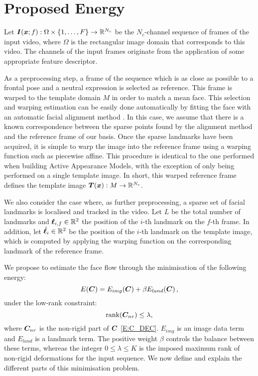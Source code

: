 \section{Proposed Energy}
Let $\boldsymbol{I}(\boldsymbol{x};f):\Omega\times \{1,\ldots,F\} \rightarrow \mathbb{R}^{N_c}$ be the
$N_c$-channel sequence of frames of the input video, where $\Omega$ is the
rectangular image domain that corresponds to this video. The channels of the
input frames originate from the application of some appropriate feature descriptor.

As a preprocessing step, a frame of the sequence which is as close as possible to
a frontal pose and a neutral expression is selected as reference. This frame is
warped to the template domain $M$ in order to match a mean face. This selection
and warping estimation can be easily done automatically by fitting the face
with an automatic facial alignment method \cite{kazemi2014one,matthews2004active}. In this 
case, we assume that there is a known correspondence between the sparse points
found by the alignment method and the reference frame of our basis. Once the
sparse landmarks have been acquired, it is simple to warp the image into the
reference frame using a warping function such as piecewise affine. This
procedure is identical to the one performed when building Active Appearance
Models, with the exception of only being performed on a single template image.
In short, this warped reference frame defines the template image 
$\boldsymbol{T}(\boldsymbol{x}):M \rightarrow \mathbb{R}^{N_c}$.

We also consider the case where, as further preprocessing, a sparse set of facial
landmarks is localised and tracked in the video. Let $L$ be the total number of
landmarks and $\boldsymbol{\ell}_{i,f}\in\mathbb{R}^2$ the position of the $i$-th landmark on the
$f$-th frame. In addition, let $\hat{\boldsymbol{\ell}}_i\in\mathbb{R}^2$ be the position of the
$i$-th landmark on the template image, which is computed by applying the warping
function on the corresponding landmark of the reference frame.

We propose to estimate the face flow through the minimisation of the following energy:
\begin{equation}
    E(\boldsymbol{C}) = E_{img}(\boldsymbol{C}) + \beta E_{land}(\boldsymbol{C}) \,,
\end{equation}
under the low-rank constraint:
\begin{equation}\label{eq:lowrank}
    \mbox{rank}(\boldsymbol{C}_{nr}) \leq \lambda,
\end{equation}
where $\boldsymbol{C}_{nr}$ is the non-rigid part of $\boldsymbol{C}$ \eqref{E:C_DEC}. 
$E_{img}$ is an image data 
term and $E_{land}$ is a landmark term. The positive weight $\beta$ 
controls the balance between these terms, whereas the integer $0\leq\lambda\leq K$ is the 
imposed maximum rank of non-rigid deformations for the input sequence. 
We now define and explain the different parts of this minimisation problem.

